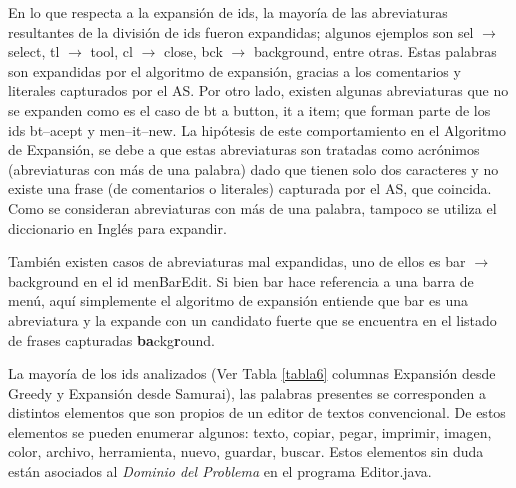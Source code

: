 En lo que respecta a la expansión de ids, la mayoría de las abreviaturas resultantes de la división de ids fueron expandidas; algunos ejemplos son \textsf{sel} $\rightarrow$ \textsf{select}, \textsf{tl} $\rightarrow$ \textsf{tool}, \textsf{cl} $\rightarrow$ \textsf{close}, \textsf{bck} $\rightarrow$ \textsf{background}, entre otras. Estas palabras son expandidas por el algoritmo de expansión, gracias a los comentarios y literales capturados por el AS.
Por otro lado, existen algunas abreviaturas que no se expanden como es el caso de \textsf{bt} a \textsf{button}, \textsf{it} a \textsf{item}; que forman parte de los ids \textsf{bt--acept} y \textsf{men--it--new}. La hipótesis de este comportamiento en el Algoritmo de Expansión, se debe a que estas abreviaturas son tratadas como acrónimos (abreviaturas con más de una palabra) dado que tienen solo dos caracteres y no existe una frase (de comentarios o literales) capturada por el AS, que coincida. Como se consideran abreviaturas con más de una palabra, tampoco se utiliza el diccionario en Inglés para expandir.

También existen casos de abreviaturas mal expandidas, uno de ellos es \textsf{bar} $\rightarrow$ \textsf{background} en el id \textsf{menBarEdit}. Si bien \textsf{bar} hace referencia a una barra de menú, aquí simplemente el algoritmo de expansión entiende que \textsf{bar} es una abreviatura y la expande con un candidato fuerte que se encuentra en el listado de frases capturadas \textsf{\textbf{ba}ckg\textbf{r}ound}.

La mayoría de los ids analizados (Ver Tabla \ref{tabla6} columnas Expansión desde Greedy y Expansión desde Samurai), las palabras presentes se corresponden a distintos elementos que son propios de un editor de textos convencional. De estos elementos se pueden enumerar algunos: texto, copiar, pegar, imprimir, imagen, color, archivo, herramienta, nuevo, guardar, buscar. Estos elementos sin duda están asociados al \textit{Dominio del Problema} en el programa Editor.java.


